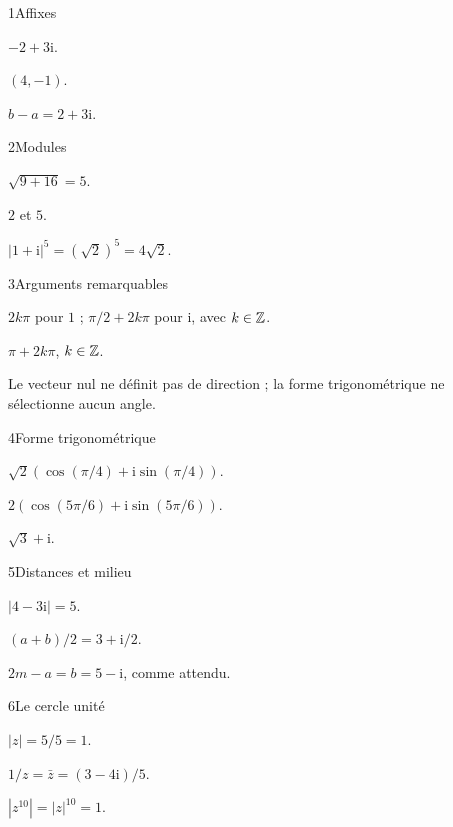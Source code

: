 \begin{corrige}{1}{Affixes}
\begin{questions}
\item $-2+3\mathrm i$.
\item $(4,-1)$.
\item $b-a=2+3\mathrm i$.
\end{questions}
\end{corrige}
\begin{corrige}{2}{Modules}
\begin{questions}
\item $\sqrt{9+16}=5$.
\item $2$ et $5$.
\item $|1+\mathrm i|^5=(\sqrt2)^5=4\sqrt2$.
\end{questions}
\end{corrige}
\begin{corrige}{3}{Arguments remarquables}
\begin{questions}
\item $2k\pi$ pour $1$ ; $\pi/2+2k\pi$ pour $\mathrm i$, avec $k\in\mathbb{Z}$.
\item $\pi+2k\pi$, $k\in\mathbb{Z}$.
\item Le vecteur nul ne définit pas de direction ; la forme trigonométrique ne sélectionne aucun angle.
\end{questions}
\end{corrige}
\begin{corrige}{4}{Forme trigonométrique}
\begin{questions}
\item $\sqrt2(\cos(\pi/4)+\mathrm i\sin(\pi/4))$.
\item $2(\cos(5\pi/6)+\mathrm i\sin(5\pi/6))$.
\item $\sqrt3+\mathrm i$.
\end{questions}
\end{corrige}
\begin{corrige}{5}{Distances et milieu}
\begin{questions}
\item $|4-3\mathrm i|=5$.
\item $(a+b)/2=3+\mathrm i/2$.
\item $2m-a=b=5-\mathrm i$, comme attendu.
\end{questions}
\end{corrige}
\begin{corrige}{6}{Le cercle unité}
\begin{questions}
\item $|z|=5/5=1$.
\item $1/z=\bar z=(3-4\mathrm i)/5$.
\item $|z^{10}|=|z|^{10}=1$.
\end{questions}
\end{corrige}
